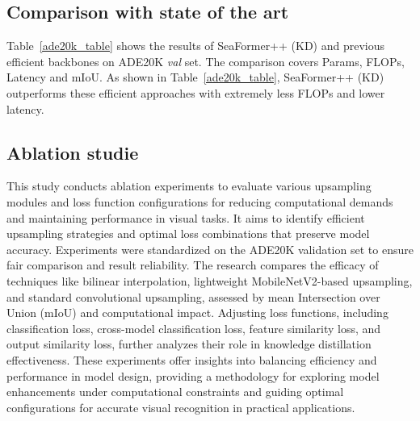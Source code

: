 \subsection{Comparison with state of the art}
Table~\ref{ade20k_table} shows the results of SeaFormer++ (KD) and previous efficient backbones on ADE20K \textit{val} set. 
The comparison covers Params, FLOPs, Latency and mIoU. 
As shown in Table~\ref{ade20k_table}, SeaFormer++ (KD) outperforms these efficient approaches with extremely less FLOPs and lower latency. 

\subsection{Ablation studie}
This study conducts ablation experiments to evaluate various upsampling modules and loss function configurations for reducing computational demands and maintaining performance in visual tasks. It aims to identify efficient upsampling strategies and optimal loss combinations that preserve model accuracy. Experiments were standardized on the ADE20K validation set to ensure fair comparison and result reliability. The research compares the efficacy of techniques like bilinear interpolation, lightweight MobileNetV2-based upsampling, and standard convolutional upsampling, assessed by mean Intersection over Union (mIoU) and computational impact. Adjusting loss functions, including classification loss, cross-model classification loss, feature similarity loss, and output similarity loss, further analyzes their role in knowledge distillation effectiveness. These experiments offer insights into balancing efficiency and performance in model design, providing a methodology for exploring model enhancements under computational constraints and guiding optimal configurations for accurate visual recognition in practical applications.

